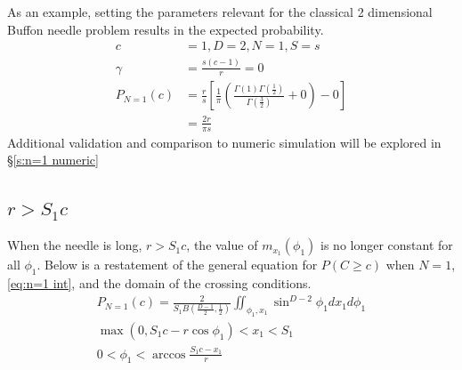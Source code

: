 \documentclass{article}
\begin{document}
	As an example, setting the parameters relevant for the classical 2 dimensional Buffon needle problem results in the expected probability.
	\begin{align}
		c&=1, D=2, N=1, S=s \\
		\gamma &= \frac{s(c-1)}{r} = 0 \\
		P_{N=1}(c) &= \frac{r}{s} \left[ \frac{1}{\pi} \left( \frac{\Gamma(1)\Gamma(\frac{1}{2})}{\Gamma(\frac{3}{2})} + 0 \right) - 0\right] \\
		&= \frac{2r}{\pi s}
	\end{align}
Additional validation and comparison to numeric simulation will be explored in \S \ref{s:n=1 numeric}

\subsection{$r>S_1c$} \label{s:long needle}
When the needle is long, $r>S_1c$, the value of $m_{x_1}(\phi_1)$ is no longer constant for all $\phi_1$. Below is a restatement
of the general equation for $P(C\ge c)$ when $N=1$, \ref{eq:n=1 int}, and the domain of the crossing conditions.
\begin{gather*}
	P_{N=1}(c) = \frac{2}{S_1 B(\frac{D-1}{2}, \frac{1}{2})} \iint_{\phi_1, x_1}\sin ^ {D-2}\phi_1 dx_1 d\phi_1 \\
	\max(0, S_1c-r\cos\phi_1) < x_1 < S_1 \\
	0 < \phi_1 < \arccos\frac{S_1c-x_1}{r}
\end{gather*}
\end{document}
